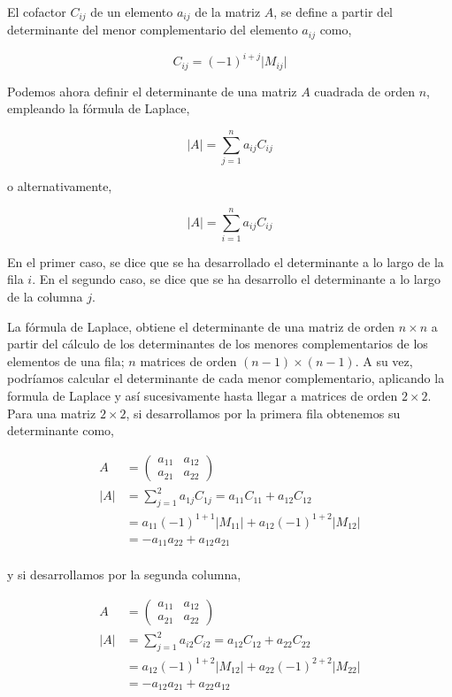  El  cofactor $C_{ij}$ de un elemento $a_{ij}$ de la matriz $A$, se define a partir del determinante del menor complementario del elemento $a_{ij}$ como,

\begin{equation*}
C_{ij}=(-1)^{i+j}\vert M_{ij} \vert
\end{equation*}

Podemos ahora definir el determinante de una matriz $A$ cuadrada de orden $n$, empleando la fórmula de Laplace, 

\begin{equation*}
\vert A \vert = \sum_{j=1}^n a_{ij}C_{ij}
\end{equation*}

o alternativamente,


\begin{equation*}
\vert A \vert = \sum_{i=1}^n a_{ij}C_{ij}
\end{equation*}

En el primer caso, se dice que se ha desarrollado el determinante a lo largo de la fila $i$. En el segundo caso, se dice que se ha desarrollo el determinante a lo largo de la columna $j$.

 La fórmula de Laplace, obtiene el determinante de una matriz de orden $n\times n$ a partir del cálculo de los determinantes de los menores complementarios de los elementos de una fila; $n$ matrices de orden $(n-1)\times (n-1)$. A su vez, podríamos calcular el determinante de cada menor complementario, aplicando la formula de Laplace y así sucesivamente hasta llegar a matrices de orden $2\times 2$. Para una matriz $2\times 2$, si desarrollamos por la primera fila obtenemos su determinante como,

\begin{align*}
A&=\begin{pmatrix}
a_{11}& a_{12}\\
a_{21}& a_{22}
\end{pmatrix}\\
\vert A \vert & =\sum_{j=1}^2a_{1j}C_{1j} =a_{11}C_{11}+a_{12}C_{12}\\
 &=a_{11}(-1)^{1+1}\vert M_{11}\vert +a_{12}(-1)^{1+2}\vert M_{12}\vert \\
 &=-a_{11}a_{22}+a_{12}a_{21}\\
\end{align*}

y si desarrollamos por la segunda columna,

\begin{align*}
A&=\begin{pmatrix}
a_{11}& a_{12}\\
a_{21}& a_{22}
\end{pmatrix}\\
\vert A \vert & =\sum_{j=1}^2a_{i2}C_{i2} =a_{12}C_{12}+a_{22}C_{22}\\
 &=a_{12}(-1)^{1+2}\vert M_{12}\vert +a_{22}(-1)^{2+2}\vert M_{22}\vert \\
 &=-a_{12}a_{21}+a_{22}a_{12}\\
\end{align*}


